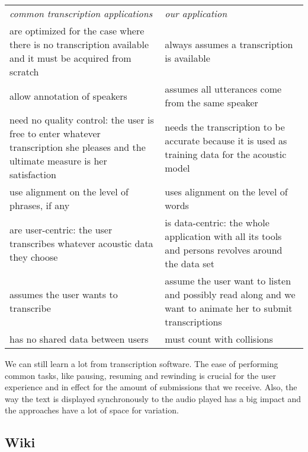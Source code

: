 \documentclass{llncs}
\begin{document}
\noindent
\begin{tabularx}{\textwidth}{
    @{\hspace{1.5em}}%
    >{\leavevmode\llap{\textbullet~}\raggedright}%
    X%
    @{\quad\hspace{1.5em}}%
    >{\leavevmode\llap{\textbullet~}\raggedright\arraybackslash}%
    X%
    @{}%
  }
  \em{common transcription applications} & \em{our application} \\
  are optimized for the case where there is no transcription available and it
  must be acquired from scratch &
    always assumes a transcription is available \\
  allow annotation of speakers &
    assumes all utterances come from the same speaker \\
  need no quality control: the user is free to enter whatever transcription she
  pleases and the ultimate measure is her satisfaction &
    needs the transcription to be accurate because it is used as training data
    for the acoustic model \\
  use alignment on the level of phrases, if any &
    uses alignment on the level of words \\
  are user-centric: the user transcribes whatever acoustic data they choose &
    is data-centric: the whole application with all its tools and persons
    revolves around the data set \\
  assumes the user wants to transcribe &
    assume the user want to listen and possibly read along and we want to
    animate her to submit transcriptions \\
  has no shared data between users &
    must count with collisions
\end{tabularx}

We can still learn a lot from transcription software. The ease of performing
common tasks, like pausing, resuming and rewinding is crucial for the user
experience and in effect for the amount of submissions that we receive. Also,
the way the text is displayed synchronously to the audio played has a big impact
and the approaches have a lot of space for variation.

\subsection{Wiki}
\end{document}
